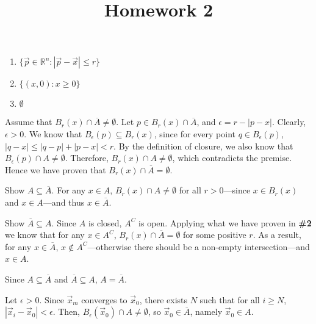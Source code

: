 \documentclass{homework}
\title{Homework 2}
\begin{document}
\maketitle

\begin{problem}{1}
\begin{enumerate}
\item $\{\vec{p} \in \mathbb{R}^n : |\vec{p} - \vec{x}| \leq r\}$
\item $\{(x, 0) : x \geq 0\}$
\item $\emptyset$
\end{enumerate}
\end{problem}

\begin{problem}{2}
Assume that $B_r(x) \cap \overline{A} \neq \emptyset$. Let $p \in B_r(x) \cap \overline{A}$, and $\epsilon = r - |p - x|$. Clearly, $\epsilon > 0$. We know that $B_{\epsilon}(p) \subseteq B_r(x)$, since for every point $q \in B_{\epsilon}(p)$, $|q - x| \leq |q - p| + |p - x| < r$. By the definition of closure, we also know that $B_{\epsilon}(p) \cap A \neq \emptyset$. Therefore, $B_r(x) \cap A \neq \emptyset$, which contradicts the premise. Hence we have proven that $B_r(x) \cap \overline{A} = \emptyset$. \QED
\end{problem}

\begin{problem}{3}
Show $A \subseteq \overline{A}$. For any $x \in A$, $B_r(x) \cap A \neq \emptyset$ for all $r > 0$---since $x \in B_r(x)$ and $x \in A$---and thus $x \in \overline{A}$.

Show $\overline{A} \subseteq A$. Since $A$ is closed, $A^C$ is open. Applying what we have proven in \textbf{\#2} we know that for any $x \in A^C$, $B_r(x) \cap \overline{A} = \emptyset$ for some positive $r$. As a result, for any $x \in \overline{A}$, $x \notin A^C$---otherwise there should be a non-empty intersection---and $x \in A$.

Since $A \subseteq \overline{A}$ and $\overline{A} \subseteq A$, $A = \overline{A}$. \QED
\end{problem}

\begin{problem}{4}
Let $\epsilon > 0$. Since $\vec{x}_m$ converges to $\vec{x}_0$, there exists $N$ such that for all $i \geq N$, $|\vec{x}_i - \vec{x}_0| < \epsilon$. Then, $B_{\epsilon}(\vec{x}_0) \cap A \neq \emptyset$, so $\vec{x}_0 \in \overline{A}$, namely $\vec{x}_0 \in A$.
\end{problem}
\end{document}

